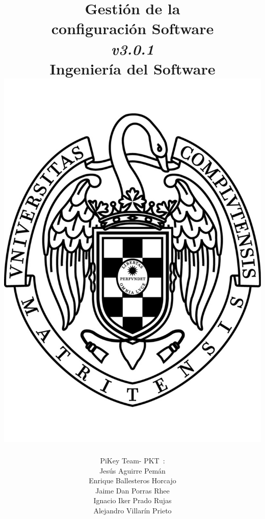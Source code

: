 \documentclass[spanish,a4paper,11pt, twoside]{report}	%
\newcommand*{\PKT}{\hbox{P}\kern-2.5pt\lower3.5pt\hbox{\small{K}}\kern-2.8pt\hbox{T}\kern-2pt}	%
\begin{document}
\title{\textbf{\huge{Gestión de la \\ 
	configuración Software}} \\ 
	\textit{v3.0.1} \\	\vspace{0.1cm}
	\Large{Ingeniería del Software} \\
	\includegraphics[scale=0.3]{ucm.pdf}}
\author{{\Large{PiKey Team-}} \PKT \ : \vspace{0.2cm} \\
	Jesús Aguirre Pemán \\
	 Enrique Ballesteros Horcajo \\
	 Jaime Dan Porras Rhee \\
	 Ignacio Iker Prado Rujas \\
	 Alejandro Villarín Prieto }
\date{\Today}
\maketitle
\end{document}
